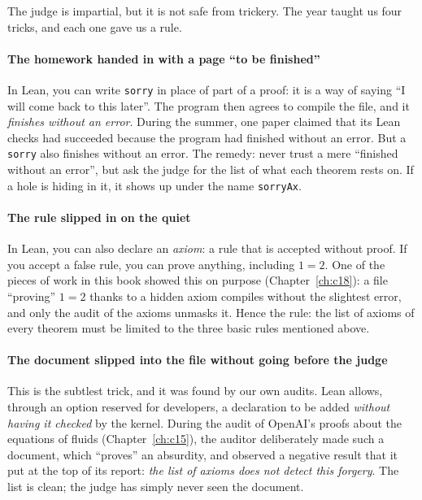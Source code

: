 The judge is impartial, but it is not safe from trickery. The year taught us four tricks, and each one gave us a rule.

\paragraph{The homework handed in with a page ``to be finished''} In Lean, you can write \texttt{sorry} in place of
part of a proof: it is a way of saying ``I will come back to this later''. The program then agrees to compile the file,
and it \emph{finishes without an error}. During the summer, one paper claimed that its Lean checks had succeeded
because the program had finished without an error. But a \texttt{sorry} also finishes without an error. The remedy:
never trust a mere ``finished without an error'', but ask the judge for the list of what each theorem rests on. If a
hole is hiding in it, it shows up under the name \texttt{sorryAx}.

\paragraph{The rule slipped in on the quiet} In Lean, you can also declare an \emph{axiom}: a rule that is accepted
without proof. If you accept a false rule, you can prove anything, including $1=2$. One of the pieces of work in this
book showed this on purpose (Chapter~\ref{ch:c18}): a file ``proving'' $1=2$ thanks to a hidden axiom compiles without
the slightest error, and only the audit of the axioms unmasks it. Hence the rule: the list of axioms of every theorem
must be limited to the three basic rules mentioned above.

\paragraph{The document slipped into the file without going before the judge} This is the subtlest trick, and it was
found by our own audits. Lean allows, through an option reserved for developers, a declaration to be added
\emph{without having it checked} by the kernel. During the audit of OpenAI's proofs about the equations of fluids
(Chapter~\ref{ch:c15}), the auditor deliberately made such a document, which ``proves'' an absurdity, and observed a
negative result that it put at the top of its report: \emph{the list of axioms does not detect this
forgery}. The list is
clean; the judge has simply never seen the document.


